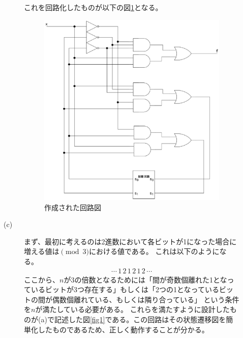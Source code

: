 \documentclass{jsarticle}
\begin{document}
\begin{description}
\begin{description}
            これを回路化したものが以下の図\ref{fig3}となる。
            \begin{figure}[H]
                \centering
                \includegraphics[width=10cm]{fig_3.eps}
                \caption{作成された回路図}
                \label{fig3}
            \end{figure}

            \item[(c)]
            まず、最初に考えるのは2進数において各ビットが1になった場合に増える値は$\pmod 3$における値である。
            これは以下のようになる。
            \begin{align}
                \cdots \,1\,2\,1\,2\,1\,2\, \cdots
            \end{align}
            ここから、$n$が3の倍数となるためには「間が奇数個離れた1となっているビットが3つ存在する」もしくは「2つの1となっているビットの間が偶数個離れている、もしくは隣り合っている」
            という条件を$n$が満たしている必要がある。
            これらを満たすように設計したものが(a)で記述した図\ref{fig1}である。この回路はその状態遷移図を簡単化したものであるため、正しく動作することが分かる。
      \end{description}


\end{description}
\end{document}
